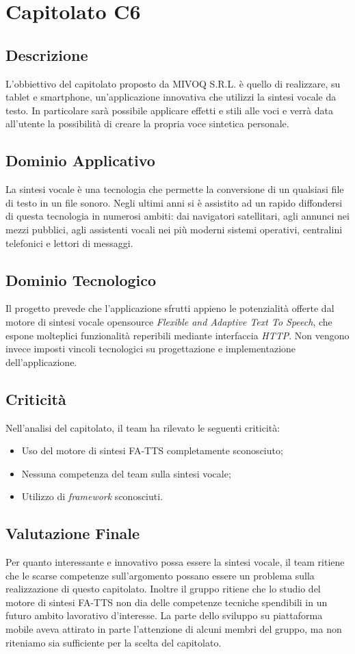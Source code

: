 \newpage
\section{Capitolato C6}
\subsection{Descrizione}
L'obbiettivo del capitolato proposto da MIVOQ S.R.L. è quello di realizzare, su tablet e smartphone, un'applicazione innovativa che utilizzi la sintesi vocale da testo. In particolare sarà possibile applicare effetti e stili alle voci e verrà data all'utente la possibilità di creare la propria voce sintetica personale.

\subsection{Dominio Applicativo}
La sintesi vocale è una tecnologia che permette la conversione di un qualsiasi file di testo in un file sonoro. Negli ultimi anni si è assistito ad un rapido diffondersi di questa tecnologia in numerosi ambiti: dai navigatori satellitari, agli annunci nei mezzi pubblici, agli assistenti vocali nei più moderni sistemi operativi, centralini telefonici e lettori di messaggi.

\subsection{Dominio Tecnologico}
Il progetto prevede che l'applicazione sfrutti appieno le potenzialità offerte dal motore di sintesi vocale opensource \textit{Flexible and Adaptive Text To Speech}, che espone molteplici funzionalità reperibili mediante interfaccia \textit{HTTP}. Non vengono invece imposti vincoli tecnologici su progettazione e implementazione dell'applicazione.

\subsection{Criticità}
Nell'analisi del capitolato, il team ha rilevato le seguenti criticità:
\begin{itemize}
\item Uso del motore di sintesi FA-TTS completamente sconosciuto;
\item Nessuna competenza del team sulla sintesi vocale;
\item Utilizzo di \textit{framework} sconosciuti.
\end{itemize}

\subsection{Valutazione Finale}
Per quanto interessante e innovativo possa essere la sintesi vocale, il team ritiene che le scarse competenze sull'argomento possano essere un problema sulla realizzazione di questo capitolato. Inoltre il gruppo ritiene che lo studio del motore di sintesi FA-TTS non dia delle competenze tecniche spendibili in un futuro ambito lavorativo d'interesse.
La parte dello sviluppo su piattaforma mobile aveva attirato in parte l'attenzione di alcuni membri del gruppo, ma non riteniamo sia sufficiente per la scelta del capitolato.
